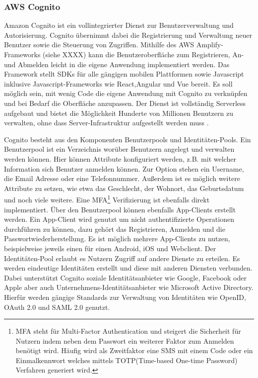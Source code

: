 {\subsubsection{AWS Cognito}
Amazon Cognito ist ein vollintegrierter Dienst zur Benutzerverwaltung und Autorisierung.
Cognito übernimmt dabei die Registrierung und Verwaltung neuer Benutzer sowie die Steuerung von Zugriffen.
Mithilfe des AWS Amplify-Frameworks (siehe XXXX) kann die Benutzeroberfläche zum Registrieren, An- und Abmelden leicht in die eigene Anwendung implementiert werden.
Das Framework stellt SDKs für alle gängigen mobilen Plattformen sowie Javascript inklusive Javascript-Frameworks wie React,Angular und Vue bereit.
Es soll möglich sein, mit wenig Code die eigene Anwendung mit Cognito zu verknüpfen und bei Bedarf die Oberfläche anzupassen.
Der Dienst ist vollständig Serverless aufgebaut und bietet die Möglichkeit \glqq Hunderte von Millionen Benutzern\grqq{} zu verwalten,
\glqq ohne dass Server-Infrastruktur aufgestellt werden muss\grqq{} \cite[]{CognitoUebersicht}. \cite[]{Cognito2}

Cognito besteht aus den Komponenten Benutzerpools und Identitäten-Pools.
Ein Benutzerpool ist ein Verzeichnis worüber Benutzern angelegt und verwalten werden können. Hier können Attribute konfiguriert werden, z.B.
mit welcher Information sich Benutzer anmelden können.
Zur Option stehen ein Username, die Email Adresse oder eine Telefonnummer. Außerdem ist es möglich weitere Attribute zu setzen, wie etwa das Geschlecht, der Wohnort,
das Geburtsdatum und noch viele weitere.
Eine MFA\footnote{MFA steht für Multi-Factor Authentication und steigert die Sicherheit für Nutzern indem neben dem Passwort
ein weiterer Faktor zum Anmelden benötigt wird. Häufig wird als Zweitfaktor eine SMS mit einem Code oder
ein Einmalkennwort welches mittels TOTP(Time-based One-time Password) Verfahren generiert wird. } Verifizierung ist ebenfalls direkt implementiert.
Über den Benutzerpool können ebenfalls App-Clients erstellt werden.
Ein App-Client wird genutzt um nicht authentifizierte Operationen durchführen zu können, dazu gehört das Registrieren, Anmelden und die Passwortwiederherstellung.
Es ist möglich mehrere App-Clients zu nutzen, beispielweise jeweils einen für einen Android, iOS und Webclient.
Der Identitäten-Pool erlaubt es Nutzern Zugriff auf andere Dienste zu erteilen. Es werden eindeutige Identitäten erstellt und diese
mit anderen Diensten verbunden. Dabei unterstützt Cognito soziale Identitätsanbieter wie Google, Facebook oder Apple aber auch
Unternehmens-Identitätsanbieter wie Microsoft Active Directory.
Hierfür werden gängige Standards zur Verwaltung von Identitäten wie OpenID, OAuth 2.0 und SAML 2.0 genutzt. \cite[]{Cognito1}

}

